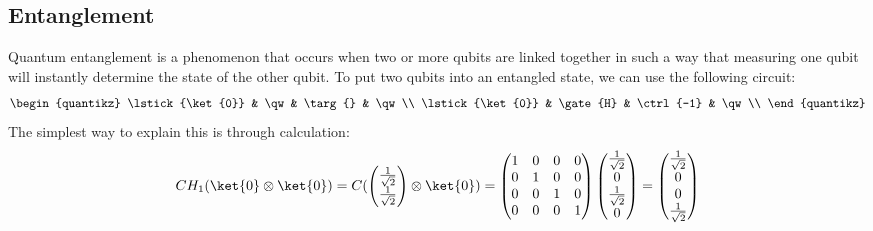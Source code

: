 \documentclass[a4paper, 11pt]{article}
\begin{document}
    
    
    
    \subsection{Entanglement} %
    Quantum entanglement is a phenomenon that occurs when two or more qubits are linked together in such a way that measuring one qubit will instantly determine the state of the other qubit.
    To put two qubits into an entangled state, we can use the following circuit:
    \begin{equation}    
        \begin{quantikz}    
            \lstick{\ket{0}} & \qw & \targ{} & \qw\\
            \lstick{\ket{0}} & \gate{H} & \ctrl{-1} & \qw\\
        \end{quantikz}
    \end{equation}The simplest way to explain this is through calculation:
    \begin{equation}    
        C H_{1} (\ket{0} \otimes \ket{0}) =
        C (
        \begin{pmatrix}    
            \frac{1}{\sqrt{2}} \\
            \frac{1}{\sqrt{2}} \\
             
        \end{pmatrix}
        \otimes
        \ket{0}
        ) = 
        \begin{pmatrix}    
            1 & 0 & 0 & 0 \\
            0 & 1 & 0 & 0 \\
            0 & 0 & 1 & 0 \\
            0 & 0 & 0 & 1 \\
             
        \end{pmatrix}
        \begin{pmatrix}    
            \frac{1}{\sqrt{2}} \\
            0 \\
            \frac{1}{\sqrt{2}} \\
            0 \\
             
        \end{pmatrix} =
        \begin{pmatrix}    
            \frac{1}{\sqrt{2}} \\
            0 \\
            0 \\
            \frac{1}{\sqrt{2}} \\
             
        \end{pmatrix}
    \end{equation}
\end{document}
